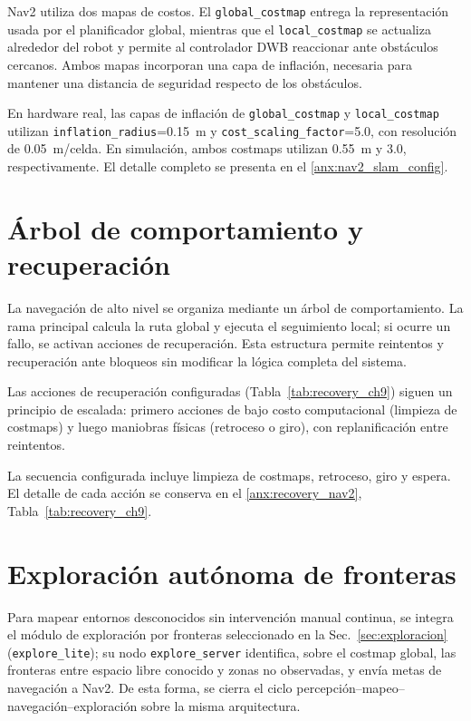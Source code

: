 Nav2 utiliza dos mapas de costos. El \texttt{global\_costmap} entrega la representación usada por el planificador global, mientras que el \texttt{local\_costmap} se actualiza alrededor del robot y permite al controlador DWB reaccionar ante obstáculos cercanos. Ambos mapas incorporan una capa de inflación, necesaria para mantener una distancia de seguridad respecto de los obstáculos.

En hardware real, las capas de inflación de \texttt{global\_costmap} y \texttt{local\_costmap} utilizan \texttt{inflation\_radius}=0.15~m y \texttt{cost\_scaling\_factor}=5.0, con resolución de 0.05~m/celda. En simulación, ambos costmaps utilizan 0.55~m y 3.0, respectivamente. El detalle completo se presenta en el \ref{anx:nav2_slam_config}.

\section{Árbol de comportamiento y recuperación}
\label{sec:bt_ch9}

La navegación de alto nivel se organiza mediante un árbol de comportamiento. La rama principal calcula la ruta global y ejecuta el seguimiento local; si ocurre un fallo, se activan acciones de recuperación. Esta estructura permite reintentos y recuperación ante bloqueos sin modificar la lógica completa del sistema.

Las acciones de recuperación configuradas (Tabla~\ref{tab:recovery_ch9}) siguen un principio de escalada: primero acciones de bajo costo computacional (limpieza de costmaps) y luego maniobras físicas (retroceso o giro), con replanificación entre reintentos.

La secuencia configurada incluye limpieza de costmaps, retroceso, giro y espera. El detalle de cada acción se conserva en el \ref{anx:recovery_nav2}, Tabla~\ref{tab:recovery_ch9}.

\section{Exploración autónoma de fronteras}
\label{sec:explore_ch9}

Para mapear entornos desconocidos sin intervención manual continua, se integra el módulo de exploración por fronteras seleccionado en la Sec.~\ref{sec:exploracion} (\texttt{explore\_lite}); su nodo \texttt{explore\_server} identifica, sobre el costmap global, las fronteras entre espacio libre conocido y zonas no observadas, y envía metas de navegación a Nav2. De esta forma, se cierra el ciclo percepción--mapeo--navegación--exploración sobre la misma arquitectura.

